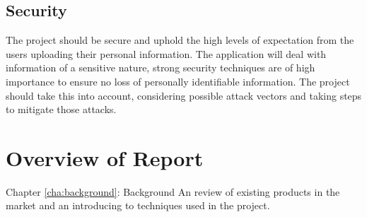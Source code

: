 \subsection{Security}
The project should be secure and uphold the high levels of expectation from the users uploading their personal information.
%
The application will deal with information of a sensitive nature, strong security techniques are of high importance to ensure no loss of personally identifiable information. 
% 
The project should take this into account, considering possible attack vectors and taking steps to mitigate those attacks.

\section{Overview of Report}

Chapter \ref{cha:background}: Background 
An review of existing products in the market and an introducing to techniques used in the project.

